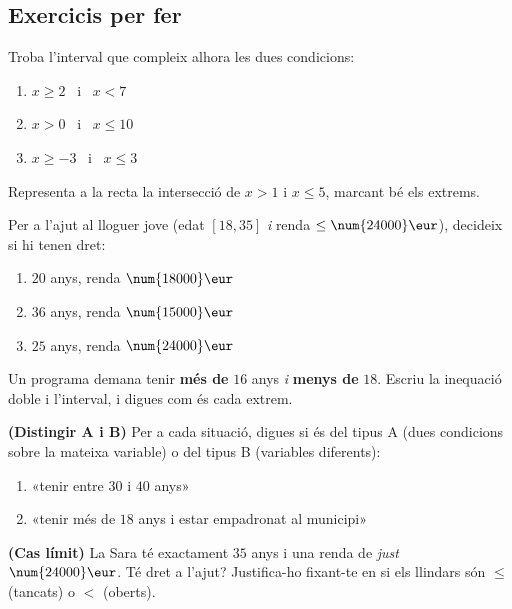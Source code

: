 \subsection{Exercicis per fer}

\begin{exercicis}
\begin{exlist}
  \item Troba l'interval que compleix alhora les dues condicions:
        \begin{enumerate}[label=\alph*), leftmargin=1.6em, topsep=2pt]
          \item $x\ge 2$ \ i \ $x<7$
          \item $x>0$ \ i \ $x\le 10$
          \item $x\ge -3$ \ i \ $x\le 3$
        \end{enumerate}
  \item Representa a la recta la intersecció de $x>1$ i $x\le 5$, marcant bé els extrems.
  \item Per a l'ajut al lloguer jove (edat $[18,35]$ \emph{i} renda $\le\num{24000}\eur$),
        decideix si hi tenen dret:
        \begin{enumerate}[label=\alph*), leftmargin=1.6em, topsep=2pt]
          \item $20$ anys, renda $\num{18000}\eur$
          \item $36$ anys, renda $\num{15000}\eur$
          \item $25$ anys, renda $\num{24000}\eur$
        \end{enumerate}
  \item Un programa demana tenir \textbf{més de} $16$ anys \emph{i} \textbf{menys de}
        $18$. Escriu la inequació doble i l'interval, i digues com és cada extrem.
  \item \textbf{(Distingir A i B)} Per a cada situació, digues si és del tipus A
        (dues condicions sobre la mateixa variable) o del tipus B (variables diferents):
        \begin{enumerate}[label=\alph*), leftmargin=1.6em, topsep=2pt]
          \item «tenir entre $30$ i $40$ anys»
          \item «tenir més de $18$ anys i estar empadronat al municipi»
        \end{enumerate}
  \item \textbf{(Cas límit)} La Sara té exactament $35$ anys i una renda de
        \emph{just} $\num{24000}\eur$. Té dret a l'ajut? Justifica-ho fixant-te en si
        els llindars són $\le$ (tancats) o $<$ (oberts).
\end{exlist}
\end{exercicis}

